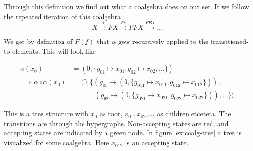 \documentclass[12pt]{article}
\theoremstyle{definition}
\newcommand{\1}{\mathbbm{1}}
\begin{document}
Through this definition we find out what a coalgebra does on our set. If we follow the repeated iteration of this coalgebra
\[
    X\xrightarrow{\alpha} FX \xrightarrow{F\alpha} FFX \xrightarrow{FF\alpha} \dots
\]

We get by definition of $F(f)$ that $\alpha$ gets recursively applied to the transitioned-to elements. This will look like

\begin{align*}
    \alpha(x_0) &= (0, \{g_{01}\mapsto x_{01}, g_{02}\mapsto x_{02}, \dots\})\\
    \implies \alpha\circ\alpha(x_0) &= (0, \{(g_{01}\mapsto (0, \{g_{011}\mapsto x_{011}, g_{012}\mapsto x_{012}\})),\\
    &\hspace{40pt}(g_{02}\mapsto (0, \{g_{021}\mapsto x_{021}, g_{022}\mapsto x_{022}\})), \dots\})
\end{align*}

This is a tree structure with $x_0$ as root, $x_{01}, x_{02}, \dots$ as children etcetera. The transitions are through the hypergraphs. Non-accepting states are red, and accepting states are indicated by a green node. In figure \ref{ex:coalg-tree} a tree is visualized for some coalgebra. Here $x_{012}$ is an accepting state.
\end{document}
